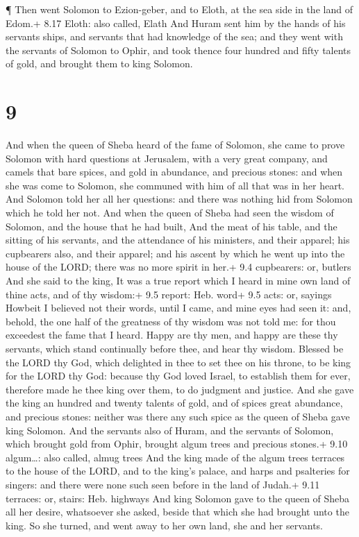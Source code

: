  ¶ Then went Solomon to Ezion-geber, and to Eloth, at the
sea side in the land of Edom.+ 8.17 Eloth: also called, Elath
 And Huram sent him by the hands of his servants ships, and
servants that had knowledge of the sea; and they went with the servants
of Solomon to Ophir, and took thence four hundred and fifty talents of
gold, and brought them to king Solomon.

\hypertarget{section-8}{%
\section{9}\label{section-8}}

 And when the queen of Sheba heard of the fame of Solomon,
she came to prove Solomon with hard questions at Jerusalem, with a very
great company, and camels that bare spices, and gold in abundance, and
precious stones: and when she was come to Solomon, she communed with him
of all that was in her heart.  And Solomon told her all her
questions: and there was nothing hid from Solomon which he told her not.
 And when the queen of Sheba had seen the wisdom of Solomon,
and the house that he had built,  And the meat of his table,
and the sitting of his servants, and the attendance of his ministers,
and their apparel; his cupbearers also, and their apparel; and his
ascent by which he went up into the house of the LORD; there was no more
spirit in her.+ 9.4 cupbearers: or, butlers  And she said to
the king, It was a true report which I heard in mine own land of thine
acts, and of thy wisdom:+ 9.5 report: Heb. word+ 9.5 acts: or, sayings
 Howbeit I believed not their words, until I came, and mine
eyes had seen it: and, behold, the one half of the greatness of thy
wisdom was not told me: for thou exceedest the fame that I heard.
 Happy are thy men, and happy are these thy servants, which
stand continually before thee, and hear thy wisdom.  Blessed
be the LORD thy God, which delighted in thee to set thee on his throne,
to be king for the LORD thy God: because thy God loved Israel, to
establish them for ever, therefore made he thee king over them, to do
judgment and justice.  And she gave the king an hundred and
twenty talents of gold, and of spices great abundance, and precious
stones: neither was there any such spice as the queen of Sheba gave king
Solomon.  And the servants also of Huram, and the servants
of Solomon, which brought gold from Ophir, brought algum trees and
precious stones.+ 9.10 algum\ldots: also called, almug trees
 And the king made of the algum trees terraces to the house
of the LORD, and to the king's palace, and harps and psalteries for
singers: and there were none such seen before in the land of Judah.+
9.11 terraces: or, stairs: Heb. highways  And king Solomon
gave to the queen of Sheba all her desire, whatsoever she asked, beside
that which she had brought unto the king. So she turned, and went away
to her own land, she and her servants.

